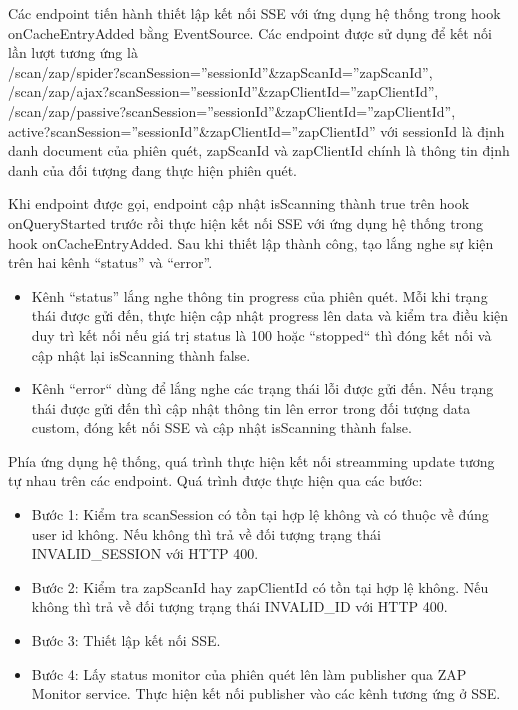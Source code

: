 Các endpoint tiến hành thiết lập kết nối SSE với ứng dụng hệ thống trong hook onCacheEntryAdded bằng EventSource. Các endpoint được sử dụng để kết nối lần lượt tương ứng là \\
/scan/zap/spider?scanSession=”sessionId”\&zapScanId=”zapScanId”, \\
/scan/zap/ajax?scanSession=”sessionId”\&zapClientId=”zapClientId”, \\
/scan/zap/passive?scanSession=”sessionId”\&zapClientId=”zapClientId”, \\
active?scanSession=”sessionId”\&zapClientId=”zapClientId” với sessionId là định danh document của phiên quét, zapScanId và zapClientId chính là thông tin định danh của đối tượng đang thực hiện phiên quét.

Khi endpoint được gọi, endpoint cập nhật isScanning thành true trên hook onQueryStarted trước rồi thực hiện kết nối SSE với ứng dụng hệ thống trong hook onCacheEntryAdded.
Sau khi thiết lập thành công, tạo lắng nghe sự kiện trên hai kênh “status” và “error”.
\begin{itemize}
  \item Kênh “status” lắng nghe thông tin progress của phiên quét.
  Mỗi khi trạng thái được gửi đến, thực hiện cập nhật progress lên data và kiểm tra điều kiện duy trì kết nối nếu giá trị status là 100 hoặc “stopped“ thì đóng kết nối và cập nhật lại isScanning thành false.
  \item Kênh “error“ dùng để lắng nghe các trạng thái lỗi được gửi đến.
  Nếu trạng thái được gửi đến thì cập nhật thông tin lên error trong đối tượng data custom, đóng kết nối SSE và cập nhật isScanning thành false.
\end{itemize}

Phía ứng dụng hệ thống, quá trình thực hiện kết nối streamming update tương tự nhau trên các endpoint. Quá trình được thực hiện qua các bước:

\begin{itemize}
  \item Bước 1: Kiểm tra scanSession có tồn tại hợp lệ không và có thuộc về đúng user id không. Nếu không thì trả về đối tượng trạng thái INVALID\_SESSION với HTTP 400.
  \item Bước 2: Kiểm tra zapScanId hay zapClientId có tồn tại hợp lệ không. Nếu không thì trả về đối tượng trạng thái INVALID\_ID với HTTP 400.
  \item Bước 3: Thiết lập kết nối SSE.
  \item Bước 4: Lấy status monitor của phiên quét lên làm publisher qua ZAP Monitor service. Thực hiện kết nối publisher vào các kênh tương ứng ở SSE.
\end{itemize}

